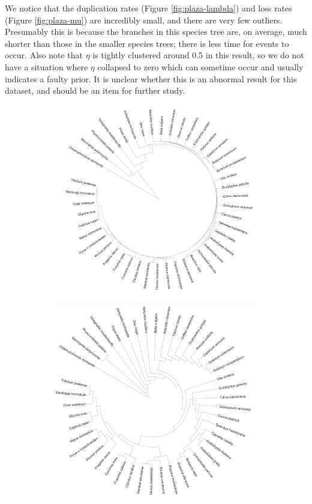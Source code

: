 \par We notice that the duplication rates (Figure \ref{fig:plaza-lambda}) and loss rates (Figure \ref{fig:plaza-mu}) are incredibly small, and there are very few outliers. Presumably this is because the branches in this species tree are, on average, much shorter than those in the smaller species trees; there is less time for events to occur. Also note that $\eta$ is tightly clustered around 0.5 in this result, so we do not have a situation where $\eta$ collapsed to zero which can sometime occur and usually indicates a faulty prior. It is unclear whether this is an abnormal result for this dataset, and should be an item for further study.

\begin{figure}
\begin{subfigure}{.5\textwidth}
  \centering
  \includegraphics[width=0.95\linewidth]{images/trees/plaza-tree.png}
  \caption{}
  \label{fig:sfig1}
\end{subfigure}%
\begin{subfigure}{.5\textwidth}
  \centering
  \includegraphics[width=0.95\linewidth]{images/trees/plaza-tree-2.png}

\end{subfigure}
\end{figure}
